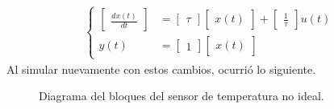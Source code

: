 \documentclass[a4paper, 10pt, onecolumn,journal]{ieeeconf}
\begin{document}
\begin{align}
	\begin{cases}
		\begin{bmatrix}
			\frac{d x(t)}{dt} 
		\end{bmatrix} &= 
		\begin{bmatrix}
			\tau
		\end{bmatrix}
		\begin{bmatrix}
			x(t) 
		\end{bmatrix} + 
		\begin{bmatrix}
			\frac{1}{\tau}
		\end{bmatrix} u(t) \\
		y(t) &= \begin{bmatrix}
			1 
		\end{bmatrix} 
		\begin{bmatrix}
			x(t)
		\end{bmatrix}
	\end{cases}\label{ecuacion matricial de sensor de temperatura}
\end{align}
Al simular nuevamente con estos cambios, ocurrió lo siguiente.
\begin{figure}[H]
	\centering
	\begin{adjustbox}{max width=\columnwidth}
	\end{adjustbox}
	\caption{Diagrama del bloques del sensor de temperatura no ideal.}
	\label{Diagrama del bloques del sensor de temperatura no ideal}
\end{figure}
\end{document}
